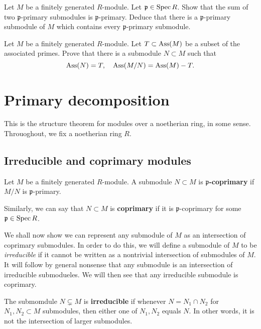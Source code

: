 \begin{exercise} 
Let $M$ be a finitely generated $R$-module. Let $\mathfrak{p} \in \operatorname{Spec} R$. Show that the sum of two
$\mathfrak{p}$-primary  submodules is $\mathfrak{p}$-primary. Deduce that
there is a $\mathfrak{p}$-primary submodule of $M$ which contains every
$\mathfrak{p}$-primary submodule. 
\end{exercise} 

\begin{exercise}[Bourbaki]
Let $M$ be a finitely generated $R$-module. Let $T \subset \operatorname{Ass}(M)$ be a
subset of the associated primes. Prove that there is a submodule $N \subset M$
such that 
\[ \operatorname{Ass}(N) = T, \quad \operatorname{Ass}(M/N) = \operatorname{Ass}(M) - T.  \]

\end{exercise} 

\section{Primary decomposition} This is the structure theorem for modules
over a noetherian ring, in some sense.
Throuoghout, we fix a noetherian ring $R$.

\subsection{Irreducible and coprimary modules}

\begin{definition} 
Let $M$ be a finitely generated $R$-module. A submodule $N \subset M$ is
\textbf{$\mathfrak{p}$-coprimary} if $M/N$ is $\mathfrak{p}$-primary.

Similarly, we can say that $N \subset M$ is \textbf{coprimary} if it is
$\mathfrak{p}$-coprimary for some $\mathfrak{p} \in \operatorname{Spec} R$.
\end{definition} 

We shall now show we can represent any submodule of $M$ as an intersection of
coprimary submodules. In order to do this, we will define a submodule of $M$ to be
\emph{irreducible} if it cannot be written as a nontrivial intersection of
submodules of $M$. It
will follow by general nonsense that any submodule is an intersection of
irreducible submodueles. We will then see that any irreducible submodule is
coprimary. 

\begin{definition} 
The submomdule $N \subsetneq M$ is \textbf{irreducible} if whenever $N = N_1 \cap N_2$ for $N_1,
N_2 \subset M$ submodules, then either one of $N_1, N_2$ equals $N$. In other words, it is not
 the intersection of larger submodules. 
\end{definition} 

